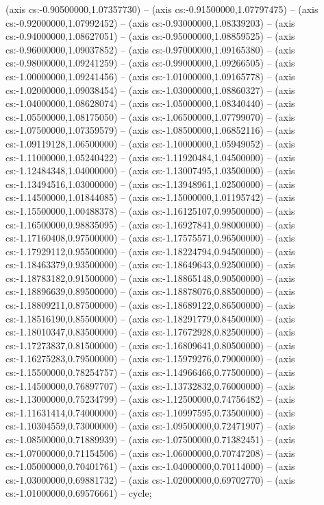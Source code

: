 (axis cs:-0.90500000,1.07357730) -- (axis cs:-0.91500000,1.07797475) -- (axis cs:-0.92000000,1.07992452) -- (axis cs:-0.93000000,1.08339203) -- (axis cs:-0.94000000,1.08627051) -- (axis cs:-0.95000000,1.08859525) -- (axis cs:-0.96000000,1.09037852) -- (axis cs:-0.97000000,1.09165380) -- (axis cs:-0.98000000,1.09241259) -- (axis cs:-0.99000000,1.09266505) -- (axis cs:-1.00000000,1.09241456) -- (axis cs:-1.01000000,1.09165778) -- (axis cs:-1.02000000,1.09038454) -- (axis cs:-1.03000000,1.08860327) -- (axis cs:-1.04000000,1.08628074) -- (axis cs:-1.05000000,1.08340440) -- (axis cs:-1.05500000,1.08175050) -- (axis cs:-1.06500000,1.07799070) -- (axis cs:-1.07500000,1.07359579) -- (axis cs:-1.08500000,1.06852116) -- (axis cs:-1.09119128,1.06500000) -- (axis cs:-1.10000000,1.05949052) -- (axis cs:-1.11000000,1.05240422) -- (axis cs:-1.11920484,1.04500000) -- (axis cs:-1.12484348,1.04000000) -- (axis cs:-1.13007495,1.03500000) -- (axis cs:-1.13494516,1.03000000) -- (axis cs:-1.13948961,1.02500000) -- (axis cs:-1.14500000,1.01844085) -- (axis cs:-1.15000000,1.01195742) -- (axis cs:-1.15500000,1.00488378) -- (axis cs:-1.16125107,0.99500000) -- (axis cs:-1.16500000,0.98835095) -- (axis cs:-1.16927841,0.98000000) -- (axis cs:-1.17160408,0.97500000) -- (axis cs:-1.17575571,0.96500000) -- (axis cs:-1.17929112,0.95500000) -- (axis cs:-1.18224794,0.94500000) -- (axis cs:-1.18463379,0.93500000) -- (axis cs:-1.18649643,0.92500000) -- (axis cs:-1.18783182,0.91500000) -- (axis cs:-1.18865148,0.90500000) -- (axis cs:-1.18896639,0.89500000) -- (axis cs:-1.18878076,0.88500000) -- (axis cs:-1.18809211,0.87500000) -- (axis cs:-1.18689122,0.86500000) -- (axis cs:-1.18516190,0.85500000) -- (axis cs:-1.18291779,0.84500000) -- (axis cs:-1.18010347,0.83500000) -- (axis cs:-1.17672928,0.82500000) -- (axis cs:-1.17273837,0.81500000) -- (axis cs:-1.16809641,0.80500000) -- (axis cs:-1.16275283,0.79500000) -- (axis cs:-1.15979276,0.79000000) -- (axis cs:-1.15500000,0.78254757) -- (axis cs:-1.14966466,0.77500000) -- (axis cs:-1.14500000,0.76897707) -- (axis cs:-1.13732832,0.76000000) -- (axis cs:-1.13000000,0.75234799) -- (axis cs:-1.12500000,0.74756482) -- (axis cs:-1.11631414,0.74000000) -- (axis cs:-1.10997595,0.73500000) -- (axis cs:-1.10304559,0.73000000) -- (axis cs:-1.09500000,0.72471907) -- (axis cs:-1.08500000,0.71889939) -- (axis cs:-1.07500000,0.71382451) -- (axis cs:-1.07000000,0.71154506) -- (axis cs:-1.06000000,0.70747208) -- (axis cs:-1.05000000,0.70401761) -- (axis cs:-1.04000000,0.70114000) -- (axis cs:-1.03000000,0.69881732) -- (axis cs:-1.02000000,0.69702770) -- (axis cs:-1.01000000,0.69576661) -- cycle;
